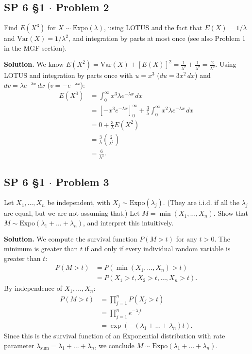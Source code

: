 \documentclass[11pt,a4paper]{article}
\begin{document}
\vspace{10pt}
\subsection{SP 6 \S1 $\cdot$ Problem 2}
\begin{tcolorbox}[title={SP 6 \S1 $\cdot$ Problem 2}]
Find $E(X^3)$ for $X \sim \text{Expo}(\lambda)$, using LOTUS and the fact that $E(X) = 1/\lambda$ and $\text{Var}(X) = 1/\lambda^2$, and integration by parts at most once (see also Problem 1 in the MGF section).
\end{tcolorbox}

\noindent \textbf{Solution.} We know $E(X^2) = \text{Var}(X) + [E(X)]^2 = \frac{1}{\lambda^2} + \frac{1}{\lambda^2} = \frac{2}{\lambda^2}$. Using LOTUS and integration by parts once with $u = x^3$ ($du = 3x^2 \, dx$) and $dv = \lambda e^{-\lambda x} \, dx$ ($v = -e^{-\lambda x}$):
\begin{align*}
E(X^3) &= \int_{0}^{\infty} x^3 \lambda e^{-\lambda x} \, dx \\
&= \left[ -x^3 e^{-\lambda x} \right]_{0}^{\infty} + \frac{3}{\lambda} \int_{0}^{\infty} x^2 \lambda e^{-\lambda x} \, dx \\
&= 0 + \frac{3}{\lambda} E(X^2) \\
&= \frac{3}{\lambda} \left( \frac{2}{\lambda^2} \right) \\
&= \frac{6}{\lambda^3}.
\end{align*}

\vspace{10pt}
\subsection{SP 6 \S1 $\cdot$ Problem 3}
\begin{tcolorbox}[title={SP 6 \S1 $\cdot$ Problem 3}]
Let $X_1, \dots, X_n$ be independent, with $X_j \sim \text{Expo}(\lambda_j)$. (They are i.i.d. if all the $\lambda_j$ are equal, but we are not assuming that.) Let $M = \min(X_1, \dots, X_n)$. Show that $M \sim \text{Expo}(\lambda_1 + \dots + \lambda_n)$, and interpret this intuitively.
\end{tcolorbox}

\noindent \textbf{Solution.} We compute the survival function $P(M > t)$ for any $t > 0$. The minimum is greater than $t$ if and only if every individual random variable is greater than $t$:
\begin{align*}
P(M > t) &= P\left( \min(X_1, \dots, X_n) > t \right) \\
&= P(X_1 > t, X_2 > t, \dots, X_n > t).
\end{align*}
By independence of $X_1, \dots, X_n$:
\begin{align*}
P(M > t) &= \prod_{j=1}^{n} P(X_j > t) \\
&= \prod_{j=1}^{n} e^{-\lambda_j t} \\
&= \exp\left( -(\lambda_1 + \dots + \lambda_n) t \right).
\end{align*}
Since this is the survival function of an Exponential distribution with rate parameter $\lambda_{\text{sum}} = \lambda_1 + \dots + \lambda_n$, we conclude $M \sim \text{Expo}(\lambda_1 + \dots + \lambda_n)$.
\end{document}
